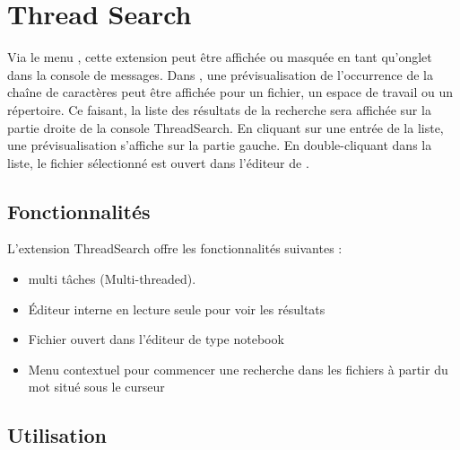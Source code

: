 \section{Thread Search}\label{sec:thread_search}

Via le menu , cette extension peut être affichée ou masquée en tant qu'onglet dans la console de messages. Dans \codeblocks, une prévisualisation de l'occurrence de la chaîne de caractères peut être affichée pour un fichier, un espace de travail ou un répertoire. Ce faisant, la liste des résultats de la recherche sera affichée sur la partie droite de la console ThreadSearch. En cliquant sur une entrée de la liste, une prévisualisation s'affiche sur la partie gauche. En double-cliquant dans la liste, le fichier sélectionné est ouvert dans l'éditeur de  \codeblocks.


\subsection{Fonctionnalités}

L'extension ThreadSearch offre les fonctionnalités suivantes :

\begin{itemize}
\item {} multi tâches (Multi-threaded).
\item  Éditeur interne en lecture seule pour voir les résultats
\item Fichier ouvert dans l'éditeur de type notebook
\item Menu contextuel  pour commencer une recherche dans les fichiers à partir du mot situé sous le curseur
\end{itemize}


\subsection{Utilisation}

